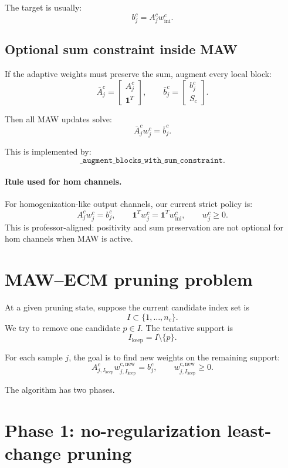 \documentclass[11pt]{article}
\newcommand{\winit}{w_{\mathrm{ini}}}
\newcommand{\bone}{\mathbf{1}}
\begin{document}
The target is usually:
\[
  b_j^c = A_j^c \winit^c.
\]

\subsection{Optional sum constraint inside MAW}

If the adaptive weights must preserve the sum, augment every local block:
\[
  \bar A_j^c =
  \begin{bmatrix}
    A_j^c\\
    \bone^T
  \end{bmatrix},
  \qquad
  \bar b_j^c =
  \begin{bmatrix}
    b_j^c\\
    S_c
  \end{bmatrix}.
\]

Then all MAW updates solve:
\[
  \bar A_j^c w_j^c = \bar b_j^c.
\]

This is implemented by:
\[
  \texttt{\_augment\_blocks\_with\_sum\_constraint}.
\]

\paragraph{Rule used for hom channels.}
For homogenization-like output channels, our current strict policy is:
\[
  A_j^c w_j^c = b_j^c,\qquad
  \bone^T w_j^c = \bone^T \winit^c,\qquad
  w_j^c\ge 0.
\]
This is professor-aligned: positivity and sum preservation are not optional for
hom channels when MAW is active.

\section{MAW--ECM pruning problem}

At a given pruning state, suppose the current candidate index set is
\[
  I \subset \{1,\ldots,n_c\}.
\]
We try to remove one candidate \(p\in I\).  The tentative support is
\[
  I_{\mathrm{keep}} = I\setminus\{p\}.
\]

For each sample \(j\), the goal is to find new weights on the remaining support:
\[
  A_{j,I_{\mathrm{keep}}}^c w_{j,I_{\mathrm{keep}}}^{c,\mathrm{new}}
  =
  b_j^c,
  \qquad
  w_{j,I_{\mathrm{keep}}}^{c,\mathrm{new}}\ge 0.
\]

The algorithm has two phases.

\section{Phase 1: no-regularization least-change pruning}
\end{document}

